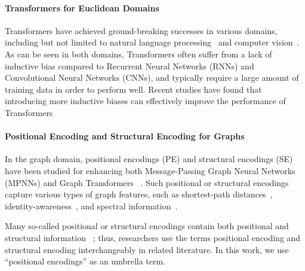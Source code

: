\documentclass[nohyperref, dvipsnames]{article}
\theoremstyle{plain}
\theoremstyle{definition}
\theoremstyle{remark}
\begin{document}
\paragraph{Transformers for Euclidean Domains}

Transformers have achieved ground-breaking successes in various domains, including but not limited to natural language processing~\cite{vaswani2017AttentionAllYou, devlin2019BERTPretrainingDeep, dai2019TransformerXLAttentiveLanguage} and computer vision~\cite{dosovitskiy2020ImageWorth16x16, liu2021SwinTransformerHierarchical}.
As can be seen in both domains, Transformers often suffer from a lack of inductive bias compared to Recurrent Neural Networks (RNNs) and Convolutional Neural Networks (CNNs), and typically require a large amount of training data in order to perform well.
Recent studies have found that introducing more inductive biases can effectively improve the performance of Transformers~\cite{liu2021SwinTransformerHierarchical, park2021HowVisionTransformers}



\paragraph{Positional Encoding and Structural Encoding for Graphs}

In the graph domain, positional encodings (PE) and structural encodings (SE)~\citep{srinivasan2019EquivalencePositionalNode} have been studied for enhancing both Message-Passing Graph Neural Networks (MPNNs) and Graph Transformers
~\cite{you2019PositionawareGraphNeural,ma2021graph,li2020DistanceEncodingDesign,zhang2021EigenGNNGraphStructure, dwivedi2020BenchmarkingGraphNeural, loukas2020WhatGraphNeural, dwivedi2021GraphNeuralNetworks, lim2022SignBasisInvariant, wang2022EquivariantStablePositional}.
Such positional or structural encodings capture various types of graph features, such as shortest-path distances~\cite{li2020DistanceEncodingDesign}, identity-awareness~\cite{you2021IdentityawareGraphNeural}, and spectral information~\cite{dwivedi2020BenchmarkingGraphNeural}.

Many so-called positional or structural encodings contain both
positional and structural information ~\cite{dwivedi2020BenchmarkingGraphNeural, srinivasan2019EquivalencePositionalNode, rampasek2022RecipeGeneralPowerful}; 
thus, researchers use the terms positional encoding and structural encoding interchangeably in related literature. In this work, we use ``positional encodings'' as an umbrella term.
\end{document}
